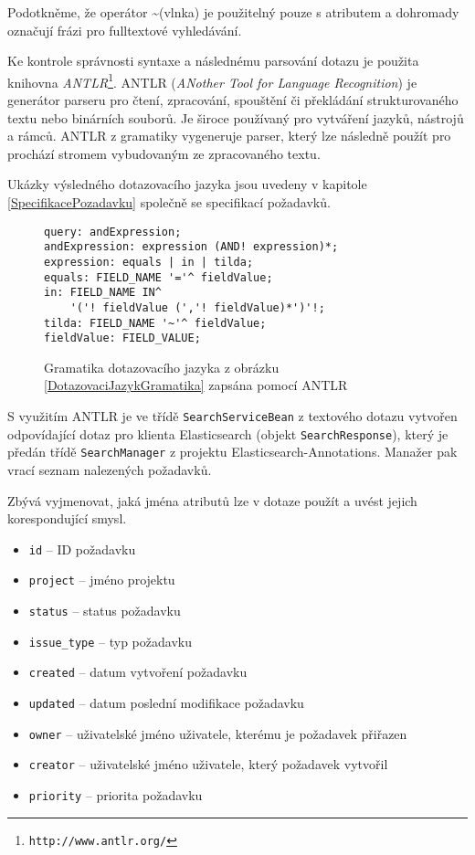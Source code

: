 \documentclass[11pt,oneside]{fithesis2}
\begin{document}
Podotkněme, že operátor \textasciitilde  (vlnka) je použitelný pouze s atributem  a dohromady označují frázi pro fulltextové vyhledávání.

Ke kontrole správnosti syntaxe a následnému parsování dotazu je použita knihovna \emph{ANTLR}\footnote{\texttt{http://www.antlr.org/}}. ANTLR (\emph{ANother Tool for Language Recognition}) je generátor parseru pro čtení, zpracování, spouštění či překládání strukturovaného textu nebo binárních souborů. Je široce používaný pro vytváření jazyků, nástrojů a rámců. ANTLR z gramatiky vygeneruje parser, který lze následně použít pro prochází stromem vybudovaným ze zpracovaného textu. \cite{ANTLR}

Ukázky výsledného dotazovacího jazyka jsou uvedeny v kapitole \ref{SpecifikacePozadavku} společně se specifikací požadavků.

\begin{figure}[htb]
\begin{lstlisting}[frame=single]
query: andExpression;
andExpression: expression (AND! expression)*;
expression: equals | in | tilda;
equals: FIELD_NAME '='^ fieldValue;
in: FIELD_NAME IN^
    '('! fieldValue (','! fieldValue)*')'!;
tilda: FIELD_NAME '~'^ fieldValue;
fieldValue: FIELD_VALUE;
\end{lstlisting}
\caption{Gramatika dotazovacího jazyka z obrázku \ref{DotazovaciJazykGramatika} zapsána pomocí ANTLR}
\label{DotazovaciJazykGramatikaAntlr}
\end{figure}

S využitím ANTLR je ve třídě \texttt{SearchServiceBean} z textového dotazu vytvořen odpovídající dotaz pro klienta Elasticsearch (objekt \texttt{SearchResponse}), který je předán třídě \texttt{SearchManager} z projektu Elasticsearch-Annotations. Manažer pak vrací seznam nalezených požadavků.

Zbývá vyjmenovat, jaká jména atributů lze v dotaze použít a uvést jejich korespondující smysl.

\begin{itemize}
	\item \texttt{id} -- ID požadavku
	\item \texttt{project} -- jméno projektu
	\item \texttt{status} -- status požadavku
	\item \texttt{issue\_type} -- typ požadavku
	\item \texttt{created} -- datum vytvoření požadavku
	\item \texttt{updated} -- datum poslední modifikace požadavku
	\item \texttt{owner} -- uživatelské jméno uživatele, kterému je požadavek přiřazen
	\item \texttt{creator} -- uživatelské jméno uživatele, který požadavek vytvořil
	\item \texttt{priority} -- priorita požadavku
\end{itemize}
\end{document}
